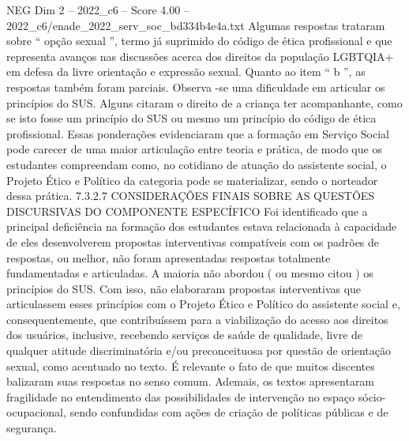 \begin{textsample}{NEG Dim 2 – 2022\_c6 – Score 4.00 – 2022\_c6/enade\_2022\_serv\_soc\_bd334b4e4a.txt}
Algumas respostas trataram sobre “ opção sexual ”, termo já suprimido do código de ética profissional e que representa avanços nas discussões acerca dos direitos da população LGBTQIA+ em defesa da livre orientação e expressão sexual.
Quanto ao item “ b ”, as respostas também foram parciais.
Observa -se uma dificuldade em articular os princípios do SUS.
Alguns citaram o direito de a criança ter acompanhante, como se isto fosse um princípio do SUS ou mesmo um princípio do código de ética profissional.
Essas ponderações evidenciaram que a formação em Serviço Social pode carecer de uma maior articulação entre teoria e prática, de modo que os estudantes compreendam como, no cotidiano de atuação do assistente social, o Projeto Ético e Político da categoria pode se materializar, sendo o norteador dessa prática. 7.3.2.7 CONSIDERAÇÕES FINAIS SOBRE AS QUESTÕES DISCURSIVAS DO COMPONENTE ESPECÍFICO Foi identificado que a principal deficiência na formação dos estudantes estava relacionada à capacidade de eles desenvolverem propostas interventivas compatíveis com os padrões de respostas, ou melhor, não foram apresentadas respostas totalmente fundamentadas e articuladas.
A maioria não abordou ( ou mesmo citou ) os princípios do SUS.
Com isso, não elaboraram propostas interventivas que articulassem esses princípios com o Projeto Ético e Político do assistente social e, consequentemente, que contribuíssem para a viabilização do acesso aos direitos dos usuários, inclusive, recebendo serviços de saúde de qualidade, livre de qualquer atitude discriminatória e/ou preconceituosa por questão de orientação sexual, como acentuado no texto.
É relevante o fato de que muitos discentes balizaram suas respostas no senso comum.
Ademais, os textos apresentaram fragilidade no entendimento das possibilidades de intervenção no espaço sócio-ocupacional, sendo confundidas com ações de criação de políticas públicas e de segurança.

\end{textsample}
